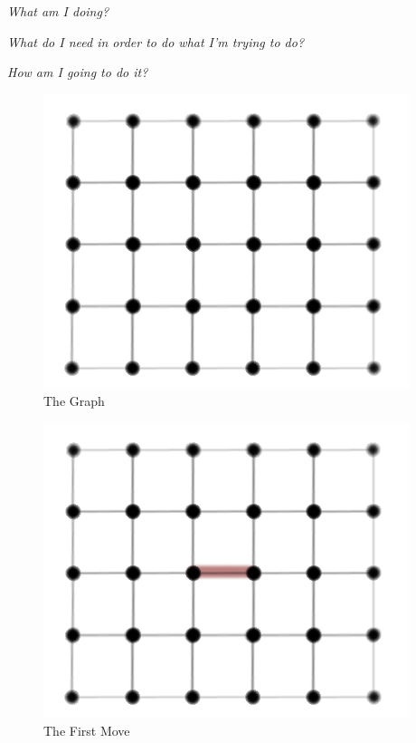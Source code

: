 \documentclass[12pt]{article}
\begin{document}
\textit{What am I doing?}\newline

\textit{What do I need in order to do what I'm trying to do?}\newline
 
\textit{How am I going to do it?}\newline

\begin{figure}[p]
 \centering
 \includegraphics[scale=0.5]{fig1}
 \caption{The Graph}
\end{figure}

\begin{figure}[p]
 \centering
 \includegraphics[scale=0.5]{fig2}
 \caption{The First Move}
\end{figure}
\end{document}
